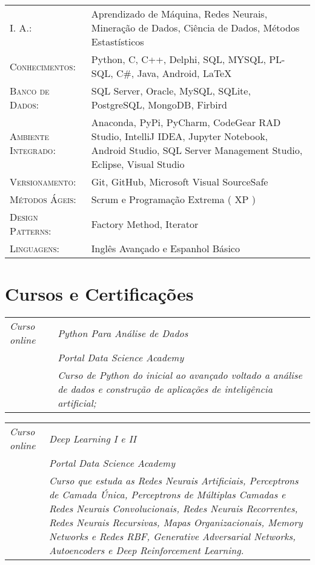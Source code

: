 \documentclass[12pt, oneside, openany, a4paper, english, brazil]{abntex2}
\begin{document}
\begin{tabular}{p{4.5cm}p{10cm}}
    \textsc{I. A.:} & Aprendizado de Máquina, Redes Neurais, Mineração de Dados, Ciência de Dados, Métodos Estastísticos \\
    \textsc{Conhecimentos:} & Python, C, C++, Delphi, SQL, MYSQL, PL-SQL, C\#, Java, Android, \LaTeX \\
    \textsc{Banco de Dados:} & SQL Server, Oracle, MySQL, SQLite, PostgreSQL, MongoDB, Firbird \\
    \textsc{Ambiente Integrado:} & Anaconda, PyPi, PyCharm, CodeGear RAD Studio, IntelliJ IDEA, Jupyter Notebook, Android Studio, SQL Server Management Studio, Eclipse, Visual Studio \\
    \textsc{Versionamento:} & Git, GitHub, Microsoft Visual SourceSafe \\
    \textsc{Métodos Ágeis:} & Scrum e Programação Extrema ( XP ) \\
    \textsc{Design Patterns:} & Factory Method, Iterator \\
    \textsc{Linguagens:} & Inglês Avançado e Espanhol Básico \\
\end{tabular}


\section{Cursos e Certificações}

\begin{tabular}{p{3.2cm}|p{11cm}}
    \emph{Curso online}
    & \emph{Python Para Análise de Dados} \\
    & \emph{Portal Data Science Academy} \\
    & \emph{Curso de Python do inicial ao avançado voltado a análise de dados e construção de aplicações de inteligência artificial;}
\end{tabular}

\begin{tabular}{p{3.2cm}|p{11cm}}
    \emph{Curso online}
    & \emph{Deep Learning I e II} \\
    & \emph{Portal Data Science Academy} \\
    & \emph{Curso que estuda as Redes Neurais Artificiais, Perceptrons de Camada Única, Perceptrons de Múltiplas Camadas e Redes Neurais Convolucionais, Redes Neurais Recorrentes, Redes Neurais Recursivas, Mapas Organizacionais, Memory Networks e Redes RBF, Generative Adversarial Networks, Autoencoders e Deep Reinforcement Learning.}
\end{tabular}
\end{document}
